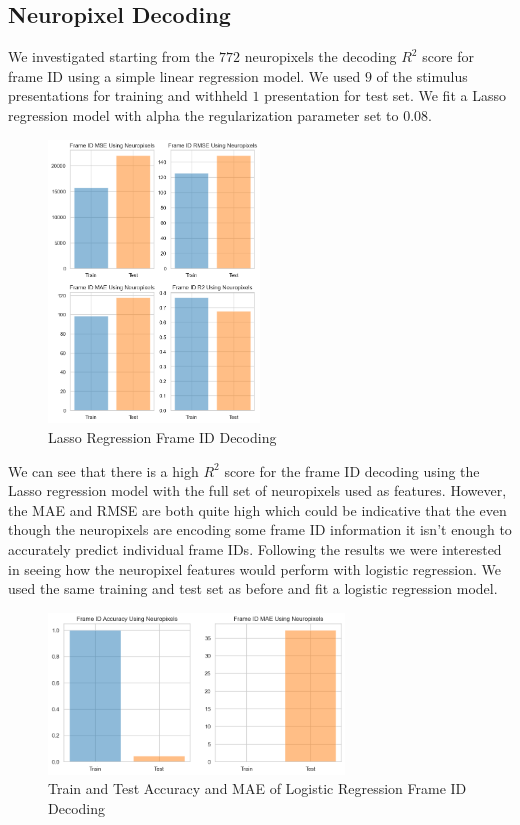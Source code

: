 \documentclass[12pt, letterpaper]{article}
\begin{document}
\subsection{Neuropixel Decoding}
We investigated starting from the $772$ neuropixels the decoding $R^2$ score for frame ID using a simple linear regression model. We used $9$ of the stimulus presentations for training and withheld $1$ presentation for test set. We fit a Lasso regression model with alpha the regularization parameter set to $0.08$. 
\begin{figure}[H]
    \centering
    \includegraphics[width=0.5\textwidth]{frame_id_metrics_lasso_.08.png}
    \caption{Lasso Regression Frame ID Decoding}
    \label{fig:lasso_frame_id}
\end{figure}
We can see that there is a high $R^2$ score for the frame ID decoding using the Lasso regression model with the full set of neuropixels used as features. However, the MAE and RMSE are both quite high which could be indicative that the even though the neuropixels are encoding some frame ID information it isn't enough to accurately predict individual frame IDs. Following the results we were interested in seeing how the neuropixel features would perform with logistic regression. We used the same training and test set as before and fit a logistic regression model.

\begin{figure}[H]
    \centering
    \includegraphics[width=0.7\textwidth]{frame_id_metrics_logistic.png}
    \caption{Train and Test Accuracy and MAE of Logistic Regression Frame ID Decoding}
    \label{fig:neuropixel_logistic_frame_id}
\end{figure}
\end{document}
